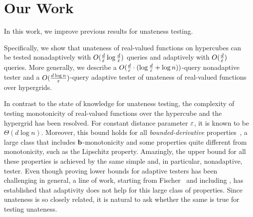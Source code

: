 
\section{Our Work}

In this work, we improve previous results for unateness testing.

Specifically, we show that unateness of real-valued functions on hypercubes can be tested nonadaptively with $O(\frac d {\varepsilon} \log \frac d {\varepsilon})$ queries and adaptively with $O(\frac d {\varepsilon})$ queries. More generally, we describe a $O(\frac d {\varepsilon} \cdot(\log\frac d{\varepsilon} + \log n))$-query nonadaptive tester and a
$O(\frac{d\log n}{\varepsilon})$-query adaptive tester of unateness of real-valued functions over hypergrids.

In contrast to the state of knowledge for unateness testing, the complexity of testing monotonicity of real-valued functions over the hypercube and the hypergrid has been resolved. For constant distance parameter $\varepsilon$, it is known to be $\Theta(d\log n)$. Moreover, this bound holds for all {\em bounded-derivative} properties~\cite{CDJS17}, a large class that includes $\mathbf{b}$-monotonicity and some properties quite different from monotonicity, such as the Lipschitz property. Amazingly, the upper bound for all these properties is achieved by the same simple and, in particular, nonadaptive, tester.
Even though proving lower bounds for adaptive testers has been challenging in general, a line of work, starting from Fischer~\cite{Fis04} and including \cite{BBM12,CS14,CDJS17}, has established that adaptivity does not help for this large class of properties. Since unateness is so closely related, it is natural to ask whether the same is true for testing unateness.

